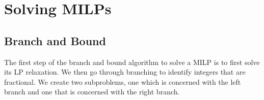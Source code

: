 \section{Solving MILPs}
\subsection{Branch and Bound}
The first step of the branch and bound algorithm to solve a MILP is to first solve its LP relaxation.
We then go through branching to identify integers that are fractional.
We create two subproblems, one which is concerned with the left branch and one that is concerned with the right branch.
